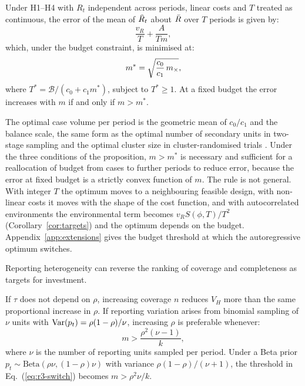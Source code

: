 \begin{proposition}
\label{prop:allocation}
Under H1--H4 with $R_t$ independent across periods, linear costs and $T$ treated as continuous, the error of the mean of $\Rhat_t$ about $\bar{R}$ over $T$ periods is given by:
\begin{equation}
  \frac{v_R}{T}+\frac{A}{Tm},
  \label{eq:alloc-indep}
\end{equation}
which, under the budget constraint, is minimised at:
\begin{equation}
  m^*=\sqrt{\frac{c_0}{c_1}\,m_{\times}},
  \label{eq:optimal-m}
\end{equation}
where $T^*=\mathcal{B}/(c_0+c_1m^*)$, subject to $T^*\ge1$. At a fixed budget the error increases with $m$ if and only if $m>m^*$.
\end{proposition}

The optimal case volume per period is the geometric mean of $c_0/c_1$ and the balance scale, the same form as the optimal number of secondary units in two-stage sampling \citep{cochran1977sampling} and the optimal cluster size in cluster-randomised trials \citep{raudenbush1997statistical}. Under the three conditions of the proposition, $m>m^*$ is necessary and sufficient for a reallocation of budget from cases to further periods to reduce error, because the error at fixed budget is a strictly convex function of $m$. The rule is not general. With integer $T$ the optimum moves to a neighbouring feasible design, with non-linear costs it moves with the shape of the cost function, and with autocorrelated environments the environmental term becomes $v_RS(\phi,T)/T^2$ (Corollary~\ref{cor:targets}) and the optimum depends on the budget. Appendix~\ref{app:extensions} gives the budget threshold at which the autoregressive optimum switches.

Reporting heterogeneity can reverse the ranking of coverage and completeness as targets for investment.

\begin{corollary}
\label{cor:switch}
If $\tau$ does not depend on $\rho$, increasing coverage $n$ reduces $V_H$ more than the same proportional increase in $\rho$. If reporting variation arises from binomial sampling of $\nu$ units with $\mathrm{Var}(p_t)=\rho(1-\rho)/\nu$, increasing $\rho$ is preferable whenever:
\begin{equation}
  m>\frac{\rho^2(\nu-1)}{k},
  \label{eq:r3-switch}
\end{equation}
where $\nu$ is the number of reporting units sampled per period. Under a Beta prior $p_t\sim\mathrm{Beta}(\rho\nu,(1-\rho)\nu)$ with variance $\rho(1-\rho)/(\nu+1)$, the threshold in Eq.~(\ref{eq:r3-switch}) becomes $m>\rho^2\nu/k$.
\end{corollary}
